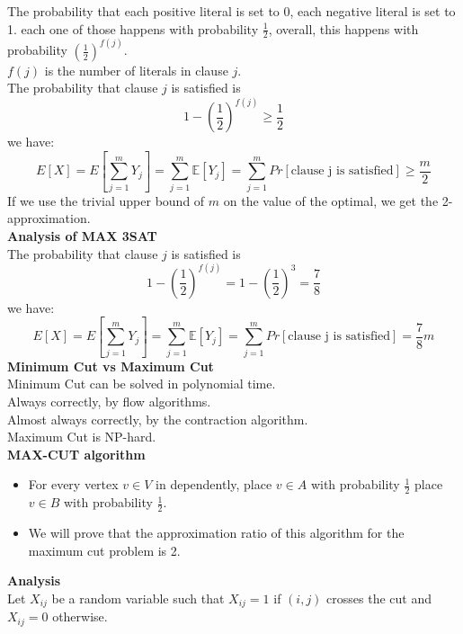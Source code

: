 \documentclass[onecolumn]{report}
\begin{document}
The probability that each positive literal is set to 0, each negative literal is set to 1.
each one of those happens with probability $\frac{1}{2}$, overall, this happens with probability $(\frac{1}{2})^{f(j)}$.\\
$f(j)$ is the number of literals in clause $j$.\\
The probability that clause $j$ is satisfied is
\begin{equation*}
    1-(\frac{1}{2})^{f(j)} \geq \frac{1}{2}
\end{equation*}
we have:
\begin{equation*}
    E[X]=E[\sum_{j=1}^m Y_j] = \sum_{j=1}^m \mathbb{E}[Y_j] = \sum_{j=1}^m Pr[\text{clause j is satisfied}] \geq \frac{m}{2}
\end{equation*}
If we use the trivial upper bound of $m$ on the value of the optimal, we get the 2-approximation.\\
\textbf{Analysis of MAX 3SAT}\\
The probability that clause $j$ is satisfied is
\begin{equation*}
    1-(\frac{1}{2})^{f(j)} =1 - (\frac{1}{2})^3 = \frac{7}{8}
\end{equation*}
we have:
\begin{equation*}
    E[X]=E[\sum_{j=1}^m Y_j] = \sum_{j=1}^m \mathbb{E}[Y_j] = \sum_{j=1}^m Pr[\text{clause j is satisfied}] = \frac{7}{8}m
\end{equation*}
\textbf{Minimum Cut vs Maximum Cut}\\
Minimum Cut can be solved in polynomial time.\\
\indent Always correctly, by flow algorithms.\\
\indent Almost always correctly, by the contraction algorithm.\\
Maximum Cut is NP-hard.\\
\textbf{MAX-CUT algorithm}
\begin{itemize}
    \item For every vertex $v \in V$ in dependently,
    \subitem place $v \in A$ with probability $\frac{1}{2}$ 
    \subitem place $v \in B$ with probability $\frac{1}{2}$.
    \item We will prove that the approximation ratio of this algorithm for the maximum cut problem is 2.
\end{itemize}
\textbf{Analysis}\\
Let $X_{ij}$ be a random variable such that $X_{ij} = 1$ if $(i,j)$ crosses the cut and $X_{ij} = 0$ otherwise.\\
\end{document}
